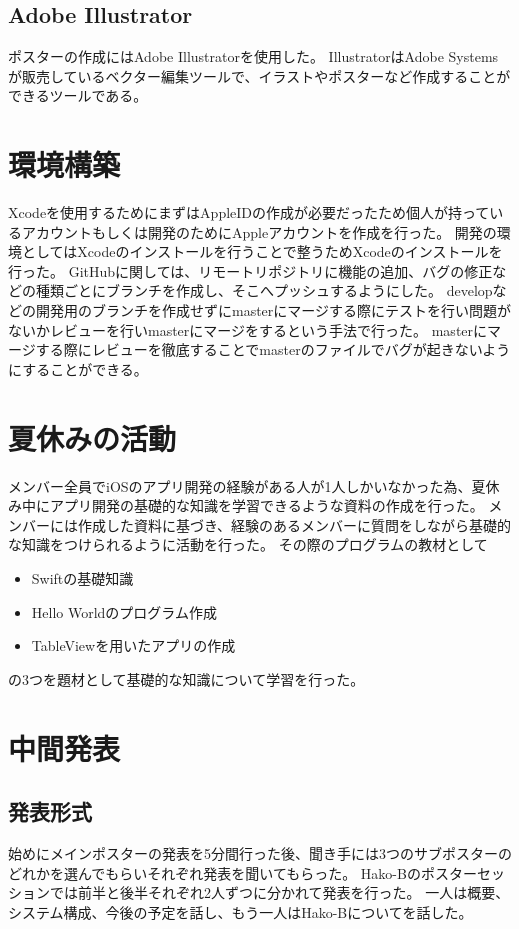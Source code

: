 \documentclass[openany,11pt,papersize]{jsbook}
\begin{document}

\subsection{Adobe Illustrator}
ポスターの作成にはAdobe Illustratorを使用した。
IllustratorはAdobe Systemsが販売しているベクター編集ツールで、イラストやポスターなど作成することができるツールである。


\section{環境構築}
Xcodeを使用するためにまずはAppleIDの作成が必要だったため個人が持っているアカウントもしくは開発のためにAppleアカウントを作成を行った。
開発の環境としてはXcodeのインストールを行うことで整うためXcodeのインストールを行った。
GitHubに関しては、リモートリポジトリに機能の追加、バグの修正などの種類ごとにブランチを作成し、そこへプッシュするようにした。
developなどの開発用のブランチを作成せずにmasterにマージする際にテストを行い問題がないかレビューを行いmasterにマージをするという手法で行った。
masterにマージする際にレビューを徹底することでmasterのファイルでバグが起きないようにすることができる。


\section{夏休みの活動}
メンバー全員でiOSのアプリ開発の経験がある人が1人しかいなかった為、夏休み中にアプリ開発の基礎的な知識を学習できるような資料の作成を行った。
メンバーには作成した資料に基づき、経験のあるメンバーに質問をしながら基礎的な知識をつけられるように活動を行った。
その際のプログラムの教材として
\begin{itemize}

\item Swiftの基礎知識
\item Hello Worldのプログラム作成
\item TableViewを用いたアプリの作成

\end{itemize}
の3つを題材として基礎的な知識について学習を行った。


\section{中間発表}
\subsection{発表形式}
始めにメインポスターの発表を5分間行った後、聞き手には3つのサブポスターのどれかを選んでもらいそれぞれ発表を聞いてもらった。
Hako-Bのポスターセッションでは前半と後半それぞれ2人ずつに分かれて発表を行った。
一人は概要、システム構成、今後の予定を話し、もう一人はHako-Bについてを話した。
\end{document}
